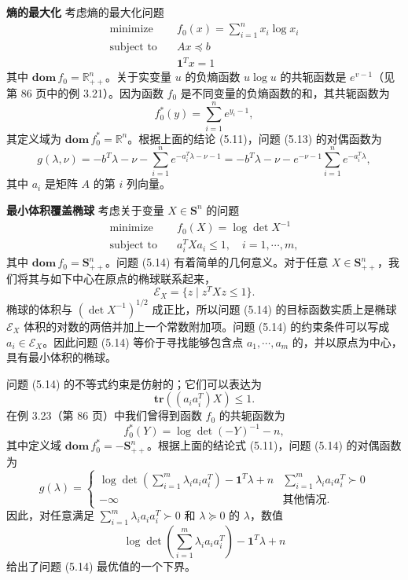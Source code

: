 \documentclass[UTF8,12pt,a4paper,fontset=fandol]{ctexart}
\begin{document}
\noindent\textbf{熵的最大化}\quad
考虑熵的最大化问题
\begin{equation}
\begin{aligned}
\text{minimize}\quad & f_0(x)=\sum_{i=1}^n x_i\log x_i\\
\text{subject to}\quad & Ax\preceq b\\
& \mathbf{1}^Tx=1
\end{aligned}
\tag{5.13}
\end{equation}
其中 $\mathbf{dom}\,f_0=\mathbb{R}_{++}^n$。关于实变量 $u$ 的负熵函数 $u\log u$ 的共轭函数是 $e^{v-1}$（见第 86 页中的例 3.21）。因为函数 $f_0$ 是不同变量的负熵函数的和，其共轭函数为
\[
f_0^\ast(y)=\sum_{i=1}^n e^{y_i-1},
\]
其定义域为 $\mathbf{dom}\,f_0^\ast=\mathbb{R}^n$。根据上面的结论 (5.11)，问题 (5.13) 的对偶函数为
\[
g(\lambda,\nu)=-b^T\lambda-\nu-\sum_{i=1}^n e^{-a_i^T\lambda-\nu-1}
=-b^T\lambda-\nu-e^{-\nu-1}\sum_{i=1}^n e^{-a_i^T\lambda},
\]
其中 $a_i$ 是矩阵 $A$ 的第 $i$ 列向量。

\noindent\textbf{最小体积覆盖椭球}\quad
考虑关于变量 $X\in\mathbf{S}^n$ 的问题
\begin{equation}
\begin{aligned}
\text{minimize}\quad & f_0(X)=\log\det X^{-1}\\
\text{subject to}\quad & a_i^T X a_i\leq 1,\quad i=1,\cdots,m,
\end{aligned}
\tag{5.14}
\end{equation}
其中 $\mathbf{dom}\,f_0=\mathbf{S}_{++}^n$。问题 (5.14) 有着简单的几何意义。对于任意 $X\in\mathbf{S}_{++}^n$，我们将其与如下中心在原点的椭球联系起来，
\[
\mathcal{E}_X=\{z\mid z^T X z\leq 1\}.
\]
椭球的体积与 $(\det X^{-1})^{1/2}$ 成正比，所以问题 (5.14) 的目标函数实质上是椭球 $\mathcal{E}_X$ 体积的对数的两倍并加上一个常数附加项。问题 (5.14) 的约束条件可以写成 $a_i\in\mathcal{E}_X$。因此问题 (5.14) 等价于寻找能够包含点 $a_1,\cdots,a_m$ 的，并以原点为中心，具有最小体积的椭球。

问题 (5.14) 的不等式约束是仿射的；它们可以表达为
\[
\mathbf{tr}\left((a_i a_i^T)X\right)\leq 1.
\]
在例 3.23（第 86 页）中我们曾得到函数 $f_0$ 的共轭函数为
\[
f_0^\ast(Y)=\log\det(-Y)^{-1}-n,
\]
其中定义域 $\mathbf{dom}\,f_0^\ast=-\mathbf{S}_{++}^n$。根据上面的结论式 (5.11)，问题 (5.14) 的对偶函数为
\begin{equation}
g(\lambda)=
\begin{cases}
\log\det\left(\sum_{i=1}^m \lambda_i a_i a_i^T\right)-\mathbf{1}^T\lambda+n
& \displaystyle \sum_{i=1}^m \lambda_i a_i a_i^T\succ 0\\
-\infty & \text{其他情况}.
\end{cases}
\tag{5.15}
\end{equation}
因此，对任意满足 $\sum_{i=1}^m\lambda_i a_i a_i^T\succ 0$ 和 $\lambda\succeq 0$ 的 $\lambda$，数值
\[
\log\det\left(\sum_{i=1}^m \lambda_i a_i a_i^T\right)-\mathbf{1}^T\lambda+n
\]
给出了问题 (5.14) 最优值的一个下界。
\end{document}

